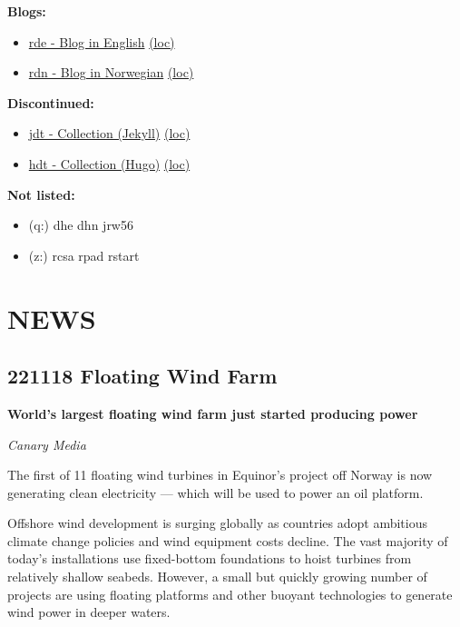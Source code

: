 \documentclass[
]{book}
\providecommand{\tightlist}{%
  \setlength{\itemsep}{0pt}\setlength{\parskip}{0pt}}
\begin{document}
\textbf{Blogs:}

\begin{itemize}
\tightlist
\item
  \href{https://dyrehaugen.github.io/rde}{rde - Blog in English} \href{http://localhost/rde}{(loc)}
\item
  \href{https://dyrehaugen.github.io/rdn}{rdn - Blog in Norwegian} \href{http://localhost/rdn}{(loc)}
\end{itemize}

\textbf{Discontinued:}

\begin{itemize}
\tightlist
\item
  \href{https://dyrehaugen.github.io/jdt}{jdt - Collection (Jekyll)} \href{http://localhost/jdt}{(loc)}
\item
  \href{https://dyrehaugen.github.io/hdt}{hdt - Collection (Hugo)} \href{http://localhost/hdt}{(loc)}
\end{itemize}

\textbf{Not listed:}

\begin{itemize}
\tightlist
\item
  (q:) dhe dhn jrw56
\item
  (z:) rcsa rpad rstart
\end{itemize}

\hypertarget{news}{%
\chapter{NEWS}\label{news}}

\hypertarget{floating-wind-farm}{%
\section{221118 Floating Wind Farm}\label{floating-wind-farm}}

\textbf{World's largest floating wind farm just started producing power}

\emph{Canary Media}

The first of 11 floating wind turbines in Equinor's project off Norway is now generating clean electricity --- which will be used to power an oil platform.

Offshore wind development is surging globally as countries adopt ambitious climate change policies and wind equipment costs decline. The vast majority of today's installations use fixed-bottom foundations to hoist turbines from relatively shallow seabeds. However, a small but quickly growing number of projects are using floating platforms and other buoyant technologies to generate wind power in deeper waters.
\end{document}

